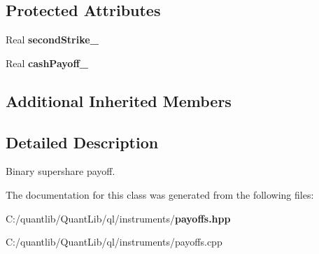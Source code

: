 \subsection*{Protected Attributes}
\begin{DoxyCompactItemize}
\item 
Real {\bfseries second\+Strike\+\_\+}\label{class_quant_lib_1_1_super_share_payoff_af6e68ebb2adc94d601ff17bc2bfeae03}

\item 
Real {\bfseries cash\+Payoff\+\_\+}\label{class_quant_lib_1_1_super_share_payoff_a61721ea24d966e472cd0c1e98da1e3fd}

\end{DoxyCompactItemize}
\subsection*{Additional Inherited Members}


\subsection{Detailed Description}
Binary supershare payoff. 

The documentation for this class was generated from the following files\+:\begin{DoxyCompactItemize}
\item 
C\+:/quantlib/\+Quant\+Lib/ql/instruments/{\bf payoffs.\+hpp}\item 
C\+:/quantlib/\+Quant\+Lib/ql/instruments/payoffs.\+cpp\end{DoxyCompactItemize}
